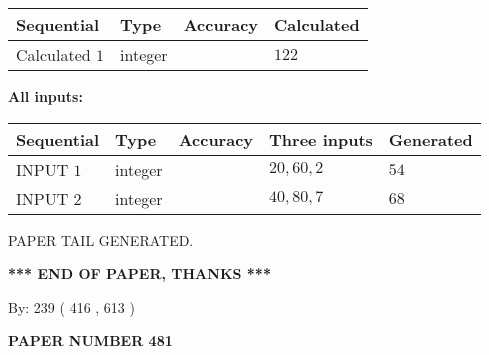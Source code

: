 \documentclass{ctexart}
\begin{document}
   
   
   
\noindent{}
   
   
  
  
\noindent\begin{tabular}{|l|l|l|l|}
\hline
 Sequential & Type & Accuracy & Calculated \\ 
\hline
 
 
  Calculated $  1 $ & integer &  & 
  $ 122 $ 
 \\  \hline  
 \end{tabular}
   
   
   
   
\noindent\vspace{0.1in}\hspace{-0.08in} {\textbf{\Large{All inputs: }}}
   
   
  
  
\noindent\begin{tabular}{|l|l|l|l|l|}
\hline
 Sequential & Type & Accuracy & Three inputs & Generated \\ 
\hline
 
 
  INPUT $  1 $ & integer &  & $
 20
 , 
 60
 , 
 2
 $ & $ 54 $ 
 \\  \hline  
 
 
  INPUT $  2 $ & integer &  & $
 40
 , 
 80
 , 
 7
 $ & $ 68 $ 
 \\  \hline  
 \end{tabular}
   
   
   
   
   
   
 \vspace{0.2in}
 
   
   
\vspace{2.0in} PAPER TAIL GENERATED.
   
   
   
   
\vspace{1.0in} 
{\textbf{\large{ *** END OF PAPER, THANKS *** }}} 
   
   
\hspace{1.0in} By: 
 239 ( 416 ,  613 )
   
   
   
   
\newpage 
\setcounter{page}{ 
   481001 } 
   
   
   
   
 {\textbf{ \Large{ PAPER NUMBER  481  }}}
   
\end{document}
